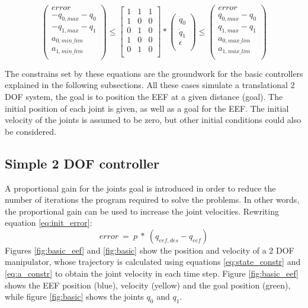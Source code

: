 \begin{equation}
\left( \begin{array}{c}
error \\
-q_{0,max} - q_{0} \\
-q_{1,max} - q_{1} \\
a_{0,min\_lim} \\
a_{1,min\_lim} \\
\end{array}
\right)	\leq 
\left[ \begin{array}{cccc}
1 & 1 & 1 \\
1 & 0 & 0 \\
0 & 1 & 0 \\
1 & 0 & 0 \\
0 & 1 & 0 \\
\end{array}
\right] *
\left( \begin{array}{c}
\dot{q}_{0} \\
\dot{q}_{1} \\
\epsilon \\
\end{array}
\right) 
\leq \left( \begin{array}{c}
error \\
q_{0,max} - q_{0} \\
q_{1,max} - q_{1} \\
a_{0,max\_lim} \\
a_{1,max\_lim} \\
\end{array}
\right)
\label{eq:a_constr}
\end{equation}

The constrains set by these equations are the groundwork for the basic controllers explained in the following subsections. All these cases simulate a translational 2 DOF system, the goal is to position the EEF at a given distance (goal). The initial position of each joint is given, as well as a goal for the EEF. The initial velocity of the joints is assumed to be zero, but other initial conditions could also be considered.

\subsection{Simple 2 DOF controller}
A proportional gain for the joints goal is introduced in order to reduce the number of iterations the program required to solve the problems. In other words, the proportional gain can be used to increase the joint velocities. Rewriting equation \ref{eq:init_error}:
\begin{equation}
error\ =\ p\ *\ \left(q_{eef,des} - q_{eef}\right)
\end{equation}
Figures \ref{fig:basic_eef} and \ref{fig:basic} show the position and velocity of a 2 DOF manipulator, whose trajectory is calculated using equations \ref{eq:state_constr} and \ref{eq:a_constr} to obtain the joint velocity in each time step. Figure \ref{fig:basic_eef}  shows the EEF position (blue), velocity (yellow) and the goal position (green), while figure \ref{fig:basic} shows the joints $q_{0}$ and $q_{1}$. 

